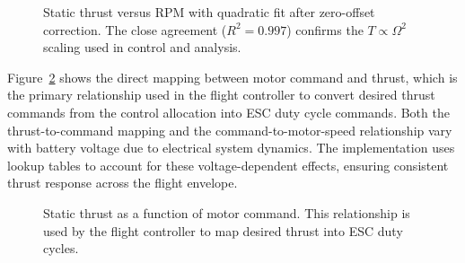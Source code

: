 \begin{figure}[htbp]
  \centering
  \caption{Static thrust versus RPM with quadratic fit after zero-offset correction. The close agreement ($R^2=0.997$) confirms the $T \propto \Omega^2$ scaling used in control and analysis.}
  \label{fig:thrust_vs_rpm}
\end{figure}

Figure~\ref{fig:thrust_vs_cmd} shows the direct mapping between motor command and thrust, which is the primary relationship used in the flight controller to convert desired thrust commands from the control allocation into ESC duty cycle commands. Both the thrust-to-command mapping and the command-to-motor-speed relationship vary with battery voltage due to electrical system dynamics. The implementation uses lookup tables to account for these voltage-dependent effects, ensuring consistent thrust response across the flight envelope.

\begin{figure}[htbp]
  \centering
  \caption{Static thrust as a function of motor command. This relationship is used by the flight controller to map desired thrust into ESC duty cycles.}
  \label{fig:thrust_vs_cmd}
\end{figure}

